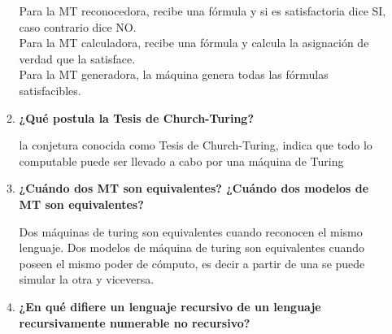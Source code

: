 \documentclass{article}
\begin{document}
\begin{enumerate}
\begin{enumerate}
Para la MT reconocedora, recibe una fórmula y si es satisfactoria dice SI, caso contrario
dice NO.\\
Para la  MT calculadora, recibe una fórmula y calcula la asignación de
verdad que la satisface.\\
Para la MT generadora, la máquina genera todas las fórmulas satisfacibles.
\item \textbf{¿Qué postula la Tesis de Church-Turing?}

la conjetura conocida como Tesis de Church-Turing, indica que todo lo computable puede ser llevado a
cabo por una máquina de Turing

\item \textbf{¿Cuándo dos MT son equivalentes? ¿Cuándo dos modelos de MT son equivalentes?}

Dos máquinas de turing son equivalentes cuando reconocen el mismo lenguaje. Dos modelos de
máquina de turing son equivalentes cuando poseen el mismo poder de cómputo, es decir a partir de una
se puede simular la otra y viceversa.
\item \textbf{¿En qué difiere un lenguaje recursivo de un lenguaje recursivamente numerable no recursivo?}


\end{enumerate}
\end{enumerate}
\end{document}
